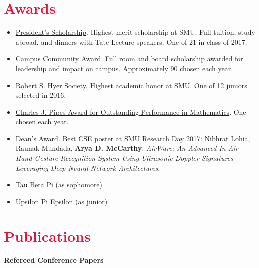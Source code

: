 \documentclass[margin, 10pt]{res} %
\let\oldsection\section
\renewcommand{\section}[1]{\oldsection{\textcolor{crimson}{#1}}}
\begin{document}
\begin{resume}

\section{Awards}

\begin{itemize}
\item \href{https://www.smu.edu/Academics/PS}{President's Scholarship}. Highest merit scholarship at SMU. Full tuition, study abroad, and dinners with Tate Lecture speakers. One of 21 in class of 2017.
\item \href{https://www.smu.edu/Academics/PS/Benefits}{Campus Community Award}. Full room and board scholarship awarded for leadership and impact on campus. Approximately 90 chosen each year.
\item \href{https://www.smu.edu/EnrollmentServices/Registrar/AcademicCeremonies/HonorsConvocation/HonorSocieties}{Robert S. Hyer Society}. Highest academic honor at SMU. One of 12 juniors selected in 2016.
\item \href{https://www.smu.edu/EnrollmentServices/Registrar/AcademicCeremonies/HonorsConvocation/AwardRecipients}{Charles J. Pipes Award for Outstanding Performance in Mathematics}. One chosen each year.
\item Dean's Award. Best CSE poster at \href{http://www.smu.edu/graduate/CurrentStudents/ResearchDay}{SMU Research Day 2017}: Nibhrat Lohia, Raunak Mundada, \textbf{Arya D. McCarthy}. \emph{AirWare: An Advanced In-Air Hand-Gesture Recognition System Using Ultrasonic Doppler Signatures Leveraging Deep Neural Network Architectures}.
\item Tau Beta Pi (as sophomore)
\item Upsilon Pi Epsilon (as junior)
\end{itemize}


\section{Publications}

\textbf{Refereed Conference Papers}


\end{resume}
\end{document}
